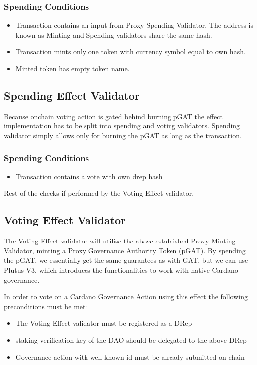 \documentclass{article}
\begin{document}
\subsubsection*{Spending Conditions}

\begin{itemize}
  \item Transaction contains an input from Proxy Spending Validator. The address is known as Minting and Spending validators share the same hash.
  \item Transaction mints only one token with currency symbol equal to own hash.
  \item Minted token has empty token name.
\end{itemize}

\subsection{Spending Effect Validator}

Because onchain voting action is gated behind burning pGAT the effect implementation has to be split into spending and voting validators. Spending validator simply allows only for burning the pGAT as long as the transaction.

\subsubsection*{Spending Conditions}

\begin{itemize}
  \item Transaction contains a vote with own drep hash
\end{itemize}

Rest  of the checks if performed by the Voting Effect validator.

\subsection{Voting Effect Validator}

The Voting Effect validator will utilise the above established Proxy Minting Validator, minting a Proxy Governance Authority Token (pGAT).
By spending the pGAT, we essentially get the same guarantees as with GAT, but we can use Plutus V3, which introduces the functionalities to work with native Cardano governance.

In order to vote on a Cardano Governance Action using this effect the following preconditions must be met:
\begin{itemize}
  \item The Voting Effect validator must be registered as a DRep
  \item staking verification key of the DAO should be delegated to the above DRep
  \item Governance action with well known id must be already submitted on-chain
\end{itemize}
\end{document}
